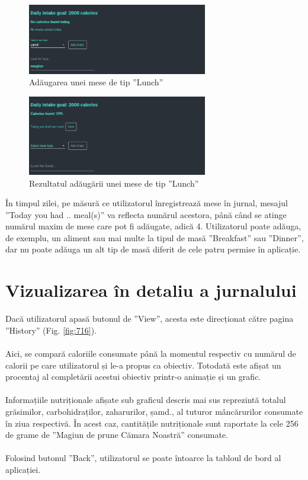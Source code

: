 \begin{figure}[!htb]
	\centering
	\includegraphics[width=0.7\textwidth]
	{../LaTeX/Images/App/add_lunch.PNG}
	\caption{Adăugarea unei mese de tip ”Lunch”}
	\label{fig:714}
\end{figure}

\begin{figure}[!htb]
	\centering
	\includegraphics[width=0.7\textwidth]
	{../LaTeX/Images/App/add_lunch-result.PNG}
	\caption{Rezultatul adăugării unei mese de tip ”Lunch”}
	\label{fig:715}
\end{figure}

În timpul zilei, pe măsură ce utilizatorul înregistrează mese în jurnal, mesajul ”Today you had .. meal(s)” va reflecta numărul acestora, până când se atinge numărul maxim de mese care pot fi adăugate, adică 4. Utilizatorul poate adăuga, de exemplu, un aliment sau mai multe la tipul de masă ”Breakfast” sau ”Dinner”, dar nu poate adăuga un alt tip de masă diferit de cele patru permise în aplicație.


\section{Vizualizarea în detaliu a jurnalului}
Dacă utilizatorul apasă butonul de ”View”, acesta este direcționat către pagina ”History” (Fig. \ref{fig:716}).
\\ \\
Aici, se compară caloriile consumate până la momentul respectiv cu numărul de calorii pe care utilizatorul și le-a propus ca obiectiv. Totodată este afișat un procentaj al completării acestui obiectiv printr-o animație și un grafic.
\\ \\
Informațiile nutriționale afișate sub graficul descris mai sus reprezintă totalul grăsimilor, carbohidraților, zaharurilor, șamd., al tuturor mâncărurilor consumate în ziua respectivă.
În acest caz, cantitățile nutriționale sunt raportate la cele 256 de grame de ”Magiun de prune Cămara Noastră” consumate.
\\ \\
Folosind butonul ”Back”, utilizatorul se poate întoarce la tabloul de bord al aplicației.

